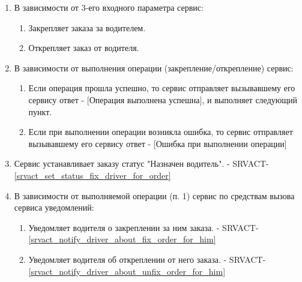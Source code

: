         \begin{alg} \label{alg_order_fastening} \mbox{}

	        \begin{enumerate}

	          \item В зависимости от 3-его входного параметра сервис:

              \begin{enumerate}
                \item Закрепляет заказа за водителем.
                \item Открепляет заказ от водителя.
              \end{enumerate}
	          
	          \item В зависимости от выполнения операции (закрепление/открепление) сервис:

              \begin{enumerate}
                \item Если операция прошла успешно, то сервис отправляет вызывавшему его сервису ответ - [Операция выполнена успешна], и выполняет следующий пункт.
                \item Если  при выполнении операции возникла ошибка, то сервис отправляет вызывавшему его сервису ответ - [Ошибка при выполнении операции]
              \end{enumerate}

            \item Сервис устанавливает заказу статус "Назначен водитель". - SRVACT-\ref{srvact_set_status_fix_driver_for_order}

            \item В зависимости от выполняемой операции (п. 1) сервис по средствам вызова сервиса уведомлений:

              \begin{enumerate}
              
                \item Уведомляет водителя о закреплении за ним заказа. - SRVACT-\ref{srvact_notify_driver_about_fix_order_for_him}

                \item Уведомляет водителя об откреплении от него заказа. - SRVACT-\ref{srvact_notify_driver_about_unfix_order_for_him}

              \end{enumerate}

	        \end{enumerate}

        	\end{alg}

